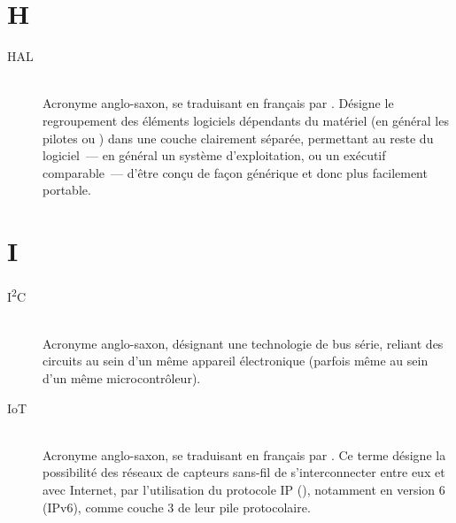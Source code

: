 
\section*{H}

\begin{description}

\item[HAL]  \\
Acronyme anglo-saxon, se traduisant en français par . Désigne le regroupement des éléments logiciels
dépendants du matériel (en général les pilotes ou ) dans
une couche clairement séparée, permettant au reste du logiciel~--- en
général un système d'exploitation, ou un exécutif comparable~--- d'être
conçu de façon générique et donc plus facilement portable.

\end{description}


\section*{I}

\begin{description}

\item[I\textsuperscript{2}C]  \\
Acronyme anglo-saxon, désignant une technologie de bus série, reliant des
circuits au sein d'un même appareil électronique (parfois même au sein
d'un même microcontrôleur).

\item[IoT]  \\
Acronyme anglo-saxon, se traduisant en français par . Ce terme désigne la possibilité des réseaux de capteurs
sans-fil de s'interconnecter entre eux et avec Internet, par l'utilisation
du protocole IP (), notamment en version 6
(IPv6), comme couche 3 de leur pile protocolaire.

\end{description}


